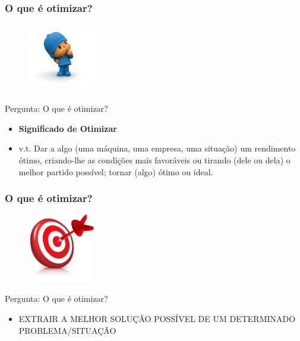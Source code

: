 \documentclass{beamer}
\begin{document}
\begin{frame}
	\frametitle{O que é otimizar?}
	\begin{figure}
		\includegraphics[width=3cm,height=3cm]{Pensando.jpg}
	\end{figure}
	\begin{block}{Pergunta: O que é otimizar?}
		\begin{itemize}
			\item[] \textbf{Significado de Otimizar}
			\item[] v.t. Dar a algo (uma máquina, uma empresa, uma situação) um rendimento ótimo, criando-lhe as condições mais favoráveis ou tirando (dele ou dela) o melhor partido possível; tornar (algo) ótimo ou ideal.
		\end{itemize}
	\end{block}	
\end{frame}

\begin{frame}
	\frametitle{O que é otimizar?}
	\begin{figure}
		\includegraphics[width=3cm,height=3cm]{alvo.png}
	\end{figure}
	\begin{block}{Pergunta: O que é otimizar?}
		\begin{itemize}
			\item[] EXTRAIR A MELHOR SOLUÇÃO POSSÍVEL DE UM DETERMINADO PROBLEMA/SITUAÇÃO
		\end{itemize}
	\end{block}	
\end{frame}
\end{document}

